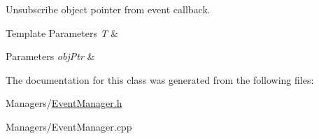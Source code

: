 Unsubscribe object pointer from event callback. 


\begin{DoxyTemplParams}{Template Parameters}
{\em T} & \\
\hline
\end{DoxyTemplParams}

\begin{DoxyParams}{Parameters}
{\em obj\+Ptr} & \\
\hline
\end{DoxyParams}


The documentation for this class was generated from the following files\+:\begin{DoxyCompactItemize}
\item 
Managers/\hyperlink{EventManager_8h}{Event\+Manager.\+h}\item 
Managers/Event\+Manager.\+cpp\end{DoxyCompactItemize}
